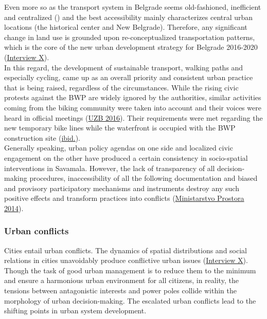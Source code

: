 \documentclass[11pt]{report}
\begin{document}
{{{{Even more so as the transport system in Belgrade seems old-fashioned, inefficient and centralized (\href{ref}{\citealt{grozdanic_belgrade_2008}}) and the best accessibility mainly characterizes central urban locations (the historical center and New Belgrade). Therefore, any significant change in land use is grounded upon re-conceptualized transportation patterns, which is the core of the new urban development strategy for Belgrade 2016-2020 (\href{InterviewX}{Interview X}).
\\

In this regard, the development of sustainable transport, walking paths and especially cycling, came up as an overall priority and consistent urban practice that is being raised, regardless of the circumstances. While the rising civic protests against the BWP are widely ignored by the authorities, similar activities coming from the biking community were taken into account and their voices were heard in official meetings  (\href{UZB}{UZB 2016}).
Their requirements were met regarding the new temporary bike lines while the waterfront is occupied with the BWP construction site (\href{uzb}{ibid.}).
\\

Generally speaking, urban policy agendas on one side and localized civic engagement on the other have produced a certain consistency in socio-spatial interventions in Savamala. However, the lack of transparency of all decision-making procedures, inaccessibility of all the following documentation and biased and provisory participatory mechanisms and instruments destroy any such positive effects and transform practices into conflicts (\href{ref}{Ministarstvo Prostora 2014}).

\subsubsection{Urban conflicts}

Cities entail urban conflicts. The dynamics of spatial distributions and social relations in cities unavoidably produce conflictive urban issues (\href{InterviewX}{Interview X}).
Though the task of good urban management is to reduce them to the minimum and ensure a harmonious urban environment for all citizens, in reality, the tensions between antagonistic interests and power poles collide within the morphology of urban decision-making. The escalated urban conflicts lead to the shifting points in urban system development.
\\

}}}}
\end{document}

